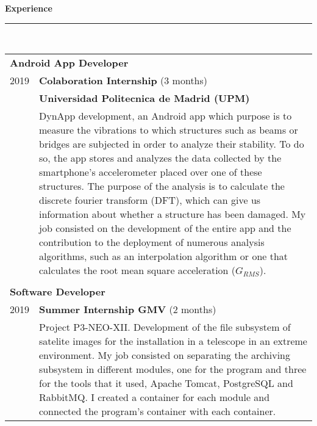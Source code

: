 \documentclass{article}
\begin{document}
\begin{minipage}[c]{0.66\linewidth}
  \setlength{\parskip}{0.3em}

  \textbf{\Large{\color{BlueViolet}Experience}}\\[-0.25cm]
  {\color{BlueViolet} \rule{\linewidth}{0.1mm} }\\[-0.05cm]
  \begin{tabular}{l l}
    \multicolumn{2}{p{6cm}}{\hspace{0.40cm} \textbf{Android App Developer}}\\[0.1cm]
    2019 & \textbf{Colaboration Internship} (3 months)\\
         & \textbf{Universidad Politecnica de Madrid (UPM)} \\
         & \multicolumn{1}{p{11cm}}{DynApp development, an Android app which purpose is to measure the vibrations to which structures such as beams or bridges are subjected in order to analyze their stability. To do so, the app stores and analyzes the data collected by the smartphone's accelerometer placed over one of these structures. The purpose of the analysis is to calculate the discrete fourier transform (DFT), which can give us information about whether a structure has been damaged. My job consisted on the development of the entire app and the contribution to the deployment of numerous analysis algorithms, such as an interpolation algorithm or one that calculates the root mean square acceleration ($G_{RMS}$).}\\ \\[-0.1cm]
    \multicolumn{2}{p{6cm}}{\hspace{0.40cm} \textbf{Software Developer}}\\[0.1cm]
    2019 & \textbf{Summer Internship GMV} (2 months)\\
         & \multicolumn{1}{p{11cm}}{Project P3-NEO-XII. Development of the file subsystem of satelite images for the installation in a telescope in an extreme environment. My job consisted on separating the archiving subsystem in different modules, one for the program and three for the tools that it used, Apache Tomcat, PostgreSQL and RabbitMQ. I created a container for each module and connected the program's container with each container.} \\
  \end{tabular}
  \vspace{0.3cm}
  

\end{minipage}
\end{document}
